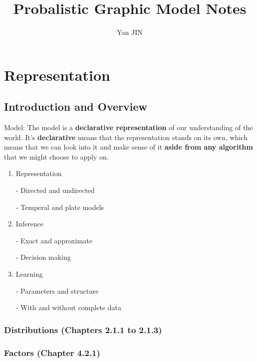 \documentclass[12pt]{article}
\numberwithin{equation}{section}
\begin{document}
\small
  \renewcommand\figurename{Fig.}
    \title{Probalistic Graphic Model\cite{Coursera}\cite{koller2009probabilistic} Notes}
    \author{Yan JIN}
    \pagestyle{fancy}\fancyhf{}
    \lhead{}
    \lfoot{\textit{}}\cfoot{}\rfoot{\thepage}
    \renewcommand{\headrulewidth}{1.pt}
    \renewcommand{\footrulewidth}{1.pt}
  \maketitle
  
\tableofcontents
\newpage

\section{Representation}
\subsection{Introduction and Overview}
Model: The model is a \textbf{declarative representation} of our understanding of the world. It's \textbf{declarative} means that the representation stands on its own, which means that we can look into it and make sense of it \textbf{aside from any algorithm} that we might choose to apply on. 

\begin{enumerate}
	\item Representation
	
	- Directed and undirected
	
	- Temperal and plate models
	\item Inference
	
	- Exact and approximate
	
	- Decision making
	\item Learning
	
	- Parameters and structure
	
	- With and without complete data
\end{enumerate}

\subsubsection{Distributions (Chapters 2.1.1 to 2.1.3)}

\subsubsection{Factors (Chapter 4.2.1)}
\end{document}
